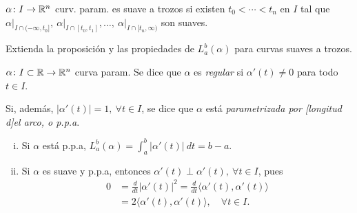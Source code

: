 \begin{definition}
	$\alpha \colon I \to \mathbb{R}^{n}$ curv. param. es suave a trozos si existen $t_{0} < \cdots < t_{n}$ en $I$ tal que $\alpha\big|_{I \cap (-\infty, t_{0}]},\ \alpha \big|_{I \cap [t_{0}, t_{1}]}, \dots,\ \alpha\big|_{I \cap [t_{n}, \infty)}$ son suaves.
\end{definition}

\begin{ex}
	Extienda la proposición y las propiedades de $L_{a}^{b}(\alpha)$ para curvas suaves a trozos.
\end{ex}

\begin{definition}
	$\alpha \colon I \subset \mathbb{R} \to \mathbb{R}^{n}$ curva param. Se dice que $\alpha$ es \textit{regular} si $\alpha'(t) \neq 0$ para todo $t \in I$. \par
	Si, además, $|\alpha'(t)| = 1,\ \forall t \in I$, se dice que $\alpha$ está \textit{parametrizada por [longitud d]el arco, o p.p.a}.
\end{definition}

\begin{note}
	\begin{enumerate}[(i)]
		\item Si $\alpha$ está p.p.a, $L_{a}^{b}(\alpha) = \int_{a}^{b} |\alpha'(t)| \ dt = b - a$.

		\item Si $\alpha$ es suave y p.p.a, entonces $\alpha'(t) \perp \alpha'(t),\ \forall t \in I$, pues
		\begin{align*}
			0 &= \frac{d}{dt} |\alpha'(t)|^{2} = \frac{d}{dt} \langle \alpha'(t), \alpha'(t) \rangle \\
			&= 2 \langle \alpha'(t), \alpha'(t) \rangle, \quad \forall t \in I
		.\end{align*}
	\end{enumerate}
\end{note}

